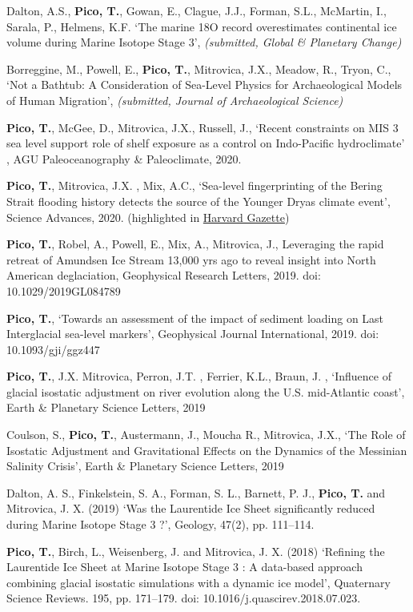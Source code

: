 \documentclass[margin,line]{res}
\begin{document}
\begin{resume}
Dalton, A.S., {\bf Pico, T.}, Gowan, E., Clague, J.J., Forman, S.L., McMartin, I., Sarala, P., Helmens, K.F. `The marine 18O record overestimates continental ice volume during Marine Isotope Stage 3', {\em (submitted, Global \& Planetary Change)}

Borreggine, M., Powell, E., {\bf Pico, T.}, Mitrovica, J.X.,  Meadow, R., Tryon, C., `Not a Bathtub: A Consideration of Sea-Level Physics for Archaeological Models of Human Migration', {\em (submitted, Journal of Archaeological Science)}

{\bf Pico, T.}, McGee, D., Mitrovica, J.X., Russell, J., `Recent constraints on MIS 3 sea level support role of shelf exposure as a control on Indo-Pacific hydroclimate' , AGU Paleoceanography \& Paleoclimate, 2020.
 
 {\bf Pico, T.}, Mitrovica, J.X. , Mix, A.C., `Sea-level fingerprinting of the Bering Strait flooding history detects the source of the Younger Dryas climate event', Science Advances, 2020. (highlighted in \href{https://news.harvard.edu/gazette/story/2020/02/ancient-records-of-bering-strait-flooding-offer-fresh-insights/}{Harvard Gazette})
 
 {\bf Pico, T.},  Robel, A., Powell, E., Mix, A., Mitrovica, J., Leveraging the rapid retreat of Amundsen Ice Stream 13,000 yrs ago to reveal insight into North American deglaciation,  Geophysical Research Letters, 2019. doi: 10.1029/2019GL084789
 
  {\bf Pico, T.}, `Towards an assessment of the impact of sediment loading on Last Interglacial sea-level markers', Geophysical Journal International, 2019. doi: 10.1093/gji/ggz447
 
{\bf Pico, T.}, J.X. Mitrovica, Perron, J.T. ,  Ferrier, K.L., Braun, J. , `Influence of glacial isostatic adjustment on river evolution along the U.S. mid-Atlantic coast', Earth \& Planetary Science Letters, 2019

Coulson, S., {\bf Pico, T.}, Austermann, J., Moucha R., Mitrovica, J.X., `The Role of Isostatic Adjustment and Gravitational Effects on the Dynamics of the Messinian Salinity Crisis', Earth \& Planetary Science Letters, 2019

Dalton, A. S., Finkelstein, S. A., Forman, S. L., Barnett, P. J., {\bf Pico, T.} and Mitrovica, J. X. (2019) ‘Was the Laurentide Ice Sheet significantly reduced during Marine Isotope Stage 3 ?’, Geology, 47(2), pp. 111–114.

{\bf Pico, T.}, Birch, L., Weisenberg, J. and Mitrovica, J. X. (2018) ‘Refining the Laurentide Ice Sheet at Marine Isotope Stage 3 : A data-based approach combining glacial isostatic simulations with a dynamic ice model’, Quaternary Science Reviews. 195, pp. 171–179. doi: 10.1016/j.quascirev.2018.07.023.


\end{resume}
\end{document}
